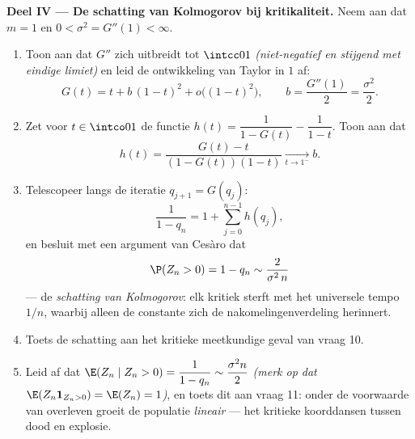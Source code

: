 \begin{problem}
\medskip
\noindent\textbf{Deel IV --- De schatting van Kolmogorov bij
kritikaliteit.} Neem aan dat $m = 1$ en $0 < \sigma^2 = G''(1) <
\infty$.
\begin{enumerate}[resume]
  \item Toon aan dat $G''$ zich  uitbreidt tot $\intcc01$
        \emph{(niet-negatief en stijgend met eindige limiet)} en
        leid de ontwikkeling van Taylor in $1$ af:
        \[
        G(t) = t + b\,(1-t)^2 + o\bigl((1-t)^2\bigr),
        \qquad b = \frac{G''(1)}2 = \frac{\sigma^2}2 .
        \]
  \item Zet voor $t \in \intco01$ de functie $h(t) = \dfrac1{1 -
        G(t)} - \dfrac1{1 - t}$. Toon aan dat
        \[
        h(t) = \frac{G(t) - t}{(1 - G(t))(1 - t)}
        \xrightarrow[t\to1^-]{} b .
        \]
  \item Telescopeer langs de iteratie $q_{j+1} = G(q_j)$:
        \[
        \frac1{1 - q_n} = 1 + \sum_{j=0}^{n-1}h(q_j),
        \]
        en besluit met een argument van Cesàro dat
        \[
        \P(Z_n > 0) = 1 - q_n \sim \frac{2}{\sigma^2\,n}
        \]
        --- de \emph{schatting van Kolmogorov}: elk kritiek
         sterft met het universele tempo $1/n$,
        waarbij alleen de constante zich de
        nakomelingenverdeling herinnert.
  \item Toets de schatting aan het kritieke meetkundige geval van
        vraag 10.
  \item Leid af dat $\E(Z_n \mid Z_n > 0) = \dfrac{1}{1 - q_n}
        \sim \dfrac{\sigma^2 n}{2}$ \emph{(merk op dat $\E(Z_n
        \mathbf 1_{Z_n>0}) = \E(Z_n) = 1$)}, en toets dit aan vraag
        11: onder de voorwaarde van overleven groeit de populatie
        \emph{lineair} --- het kritieke koorddansen tussen dood en
        explosie.
\end{enumerate}


\end{problem}
